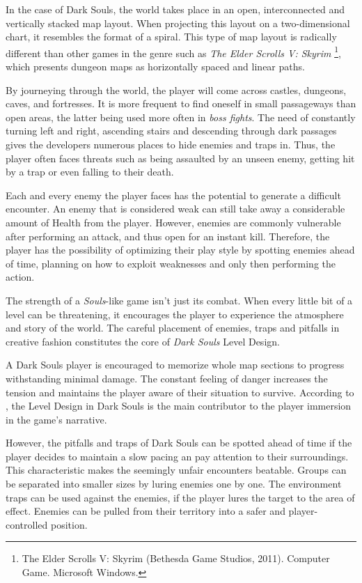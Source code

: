 \documentclass[cic,tc,english]{iiufrgs}
\begin{document}
In the case of Dark Souls, the world takes place in an open, interconnected and vertically stacked map layout. When projecting this layout on a two-dimensional chart, it resembles the format of a spiral. This type of map layout is radically different than other games in the genre such as \emph{The Elder Scrolls V: Skyrim} \footnote{The Elder Scrolls V: Skyrim (Bethesda Game Studios, 2011). Computer Game. Microsoft Windows.}, which presents  dungeon maps as horizontally spaced and linear paths.

By journeying through the world, the player will come across castles, dungeons, caves, and fortresses. It is more frequent to find oneself in small passageways than open areas, the latter being used more often in \emph{boss fights}. The need of constantly turning left and right, ascending stairs and descending through dark passages gives the developers numerous places to hide enemies and traps in. Thus, the player often faces threats such as being assaulted by an unseen enemy, getting hit by a trap or even falling to their death.

Each and every enemy the player faces has the potential to generate a difficult encounter. An enemy that is considered weak can still take away a considerable amount of Health from the player. However, enemies are commonly vulnerable after performing an attack, and thus open for an instant kill. Therefore, the player has the possibility of optimizing their play style by spotting enemies ahead of time, planning on how to exploit weaknesses and only then performing the action.

The strength of a \emph{Souls}-like game isn't just its combat. When every little bit of a level can be threatening, it encourages the player to experience the atmosphere and story of the world. The careful placement of enemies, traps and pitfalls in creative fashion constitutes the core of \emph{Dark Souls} Level Design.

A Dark Souls player is encouraged to memorize whole map sections to progress withstanding minimal damage. The constant feeling of danger increases the tension and maintains the player aware of their situation to survive. According to , the Level Design in  Dark Souls is the main contributor to the player immersion in the game's narrative.

However, the pitfalls and traps of Dark Souls can be spotted ahead of time if the player decides to maintain a slow pacing an pay attention to their surroundings. This characteristic makes the seemingly unfair encounters beatable. Groups can be separated into smaller sizes by luring enemies one by one. The environment traps can be used against the enemies, if the player lures the target to the area of effect. Enemies can be pulled from their territory into a safer and player-controlled position.
\end{document}
